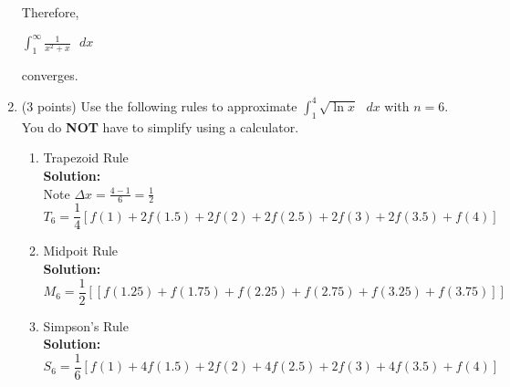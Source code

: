 \documentclass[paper=a4, fontsize=11pt]{scrartcl} %
\numberwithin{equation}{section} %
\numberwithin{figure}{section} %
\numberwithin{table}{section} %
\begin{document}
\begin{enumerate}
\begin{enumerate}
\end{enumerate}
Therefore, \begin{large}$\int_1^\infty \frac{1}{x^2+x}\text { } dx$\end{large} converges.


\item (3 points) Use the following rules to approximate $\int_1^4 \sqrt{\ln x} \text{ } dx$ with $n=6$.  You do \textbf{NOT} have to simplify using a calculator.\\
\begin{enumerate}
\item Trapezoid Rule\\
\noindent\textbf{Solution:}\\ Note $\Delta x = \frac{4-1}{6}=\frac{1}{2}$\\
\begin{equation*}
T_6=\frac{1}{4}[f(1)+2f(1.5)+2f(2)+2f(2.5)+2f(3)+2f(3.5)+f(4)]
\end{equation*}

\vspace{.5in}
\item Midpoit Rule\\
\noindent\textbf{Solution:}\\
\begin{equation*}
M_6=\frac{1}{2}[[f(1.25)+f(1.75)+f(2.25)+f(2.75)+f(3.25)+f(3.75)]]
\end{equation*}

\vspace{.5in}
\item Simpson's Rule\\
\noindent\textbf{Solution:}\\
\begin{equation*}
S_6=\frac{1}{6}[f(1)+4f(1.5)+2f(2)+4f(2.5)+2f(3)+4f(3.5)+f(4)]
\end{equation*}

\end{enumerate}

\end{enumerate}

\end{document}
